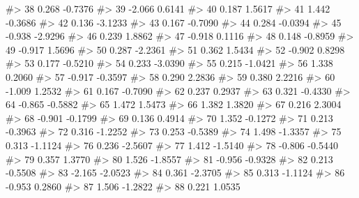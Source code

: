 \documentclass[
  letterpaper,
]{krantz}
\makeatletter
\newenvironment{Shaded}{\begin{snugshade}}{\end{snugshade}}
\newcommand{\CommentTok}[1]{\textcolor[rgb]{0.37,0.37,0.37}{#1}}
\newenvironment{kframe}{%
\medskip{}
\setlength{\fboxsep}{.8em}
 \def\at@end@of@kframe{}%
 \ifinner\ifhmode%
  \def\at@end@of@kframe{\end{minipage}}%
  \begin{minipage}{\columnwidth}%
 \fi\fi%
 \def\FrameCommand##1{\hskip\@totalleftmargin \hskip-\fboxsep
 \colorbox{shadecolor}{##1}\hskip-\fboxsep
     \hskip-\linewidth \hskip-\@totalleftmargin \hskip\columnwidth}%
 \MakeFramed {\advance\hsize-\width
   \@totalleftmargin\z@ \linewidth\hsize
   \@setminipage}}%
 {\par\unskip\endMakeFramed%
 \at@end@of@kframe}
\renewenvironment{Shaded}{\begin{kframe}}{\end{kframe}}
\makeatother
\begin{document}
\begin{Shaded}
\begin{Highlighting}[]
\CommentTok{\#\textgreater{} 38    0.268 {-}0.7376}
\CommentTok{\#\textgreater{} 39   {-}2.066  0.6141}
\CommentTok{\#\textgreater{} 40    0.187  1.5617}
\CommentTok{\#\textgreater{} 41    1.442 {-}0.3686}
\CommentTok{\#\textgreater{} 42    0.136 {-}3.1233}
\CommentTok{\#\textgreater{} 43    0.167 {-}0.7090}
\CommentTok{\#\textgreater{} 44    0.284 {-}0.0394}
\CommentTok{\#\textgreater{} 45   {-}0.938 {-}2.9296}
\CommentTok{\#\textgreater{} 46    0.239  1.8862}
\CommentTok{\#\textgreater{} 47   {-}0.918  0.1116}
\CommentTok{\#\textgreater{} 48    0.148 {-}0.8959}
\CommentTok{\#\textgreater{} 49   {-}0.917  1.5696}
\CommentTok{\#\textgreater{} 50    0.287 {-}2.2361}
\CommentTok{\#\textgreater{} 51    0.362  1.5434}
\CommentTok{\#\textgreater{} 52   {-}0.902  0.8298}
\CommentTok{\#\textgreater{} 53    0.177 {-}0.5210}
\CommentTok{\#\textgreater{} 54    0.233 {-}3.0390}
\CommentTok{\#\textgreater{} 55    0.215 {-}1.0421}
\CommentTok{\#\textgreater{} 56    1.338  0.2060}
\CommentTok{\#\textgreater{} 57   {-}0.917 {-}0.3597}
\CommentTok{\#\textgreater{} 58    0.290  2.2836}
\CommentTok{\#\textgreater{} 59    0.380  2.2216}
\CommentTok{\#\textgreater{} 60   {-}1.009  1.2532}
\CommentTok{\#\textgreater{} 61    0.167 {-}0.7090}
\CommentTok{\#\textgreater{} 62    0.237  0.2937}
\CommentTok{\#\textgreater{} 63    0.321 {-}0.4330}
\CommentTok{\#\textgreater{} 64   {-}0.865 {-}0.5882}
\CommentTok{\#\textgreater{} 65    1.472  1.5473}
\CommentTok{\#\textgreater{} 66    1.382  1.3820}
\CommentTok{\#\textgreater{} 67    0.216  2.3004}
\CommentTok{\#\textgreater{} 68   {-}0.901 {-}0.1799}
\CommentTok{\#\textgreater{} 69    0.136  0.4914}
\CommentTok{\#\textgreater{} 70    1.352 {-}0.1272}
\CommentTok{\#\textgreater{} 71    0.213 {-}0.3963}
\CommentTok{\#\textgreater{} 72    0.316 {-}1.2252}
\CommentTok{\#\textgreater{} 73    0.253 {-}0.5389}
\CommentTok{\#\textgreater{} 74    1.498 {-}1.3357}
\CommentTok{\#\textgreater{} 75    0.313 {-}1.1124}
\CommentTok{\#\textgreater{} 76    0.236 {-}2.5607}
\CommentTok{\#\textgreater{} 77    1.412 {-}1.5140}
\CommentTok{\#\textgreater{} 78   {-}0.806 {-}0.5440}
\CommentTok{\#\textgreater{} 79    0.357  1.3770}
\CommentTok{\#\textgreater{} 80    1.526 {-}1.8557}
\CommentTok{\#\textgreater{} 81   {-}0.956 {-}0.9328}
\CommentTok{\#\textgreater{} 82    0.213 {-}0.5508}
\CommentTok{\#\textgreater{} 83   {-}2.165 {-}2.0523}
\CommentTok{\#\textgreater{} 84    0.361 {-}2.3705}
\CommentTok{\#\textgreater{} 85    0.313 {-}1.1124}
\CommentTok{\#\textgreater{} 86   {-}0.953  0.2860}
\CommentTok{\#\textgreater{} 87    1.506 {-}1.2822}
\CommentTok{\#\textgreater{} 88    0.221  1.0535}

\end{Highlighting}
\end{Shaded}
\end{document}
